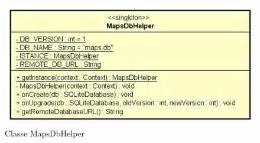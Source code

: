 \documentclass[../DefinizioneDiProdotto.tex]{subfiles}
\begin{document}
    \begin{figure}[H]
        \centering
        \includegraphics{img/MapsDbHelper.png}
        \caption{Classe MapsDbHelper}\label{fig:model::dataaccess::dao::MapsDbHelper} 
    \end{figure}
\end{document}
